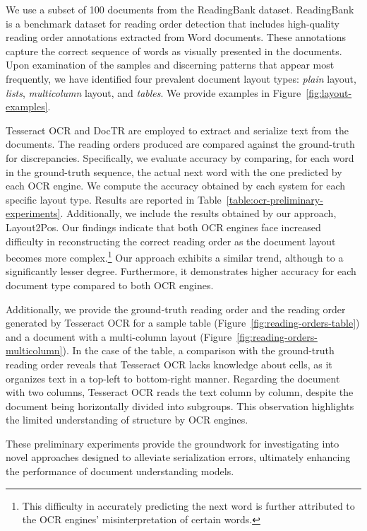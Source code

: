 We use a subset of 100 documents from the ReadingBank \citep{wang2021layoutreader} dataset. ReadingBank is a benchmark dataset for reading order detection that includes high-quality reading order annotations extracted from Word documents. These annotations capture the correct sequence of words as visually presented in the documents. Upon examination of the samples and discerning patterns that appear most frequently, we have identified four prevalent document layout types: \textit{plain} layout, \textit{lists}, \textit{multicolumn} layout, and \textit{tables}. We provide examples in Figure~\ref{fig:layout-examples}. 

Tesseract OCR and DocTR are employed to extract and serialize text from the documents. The reading orders produced are compared against the ground-truth for discrepancies. Specifically, we evaluate accuracy by comparing, for each word in the ground-truth sequence, the actual next word with the one predicted by each \ac{OCR} engine. We compute the accuracy obtained by each system for each specific layout type. Results are reported in Table~\ref{table:ocr-preliminary-experiments}. Additionally, we include the results obtained by our approach, Layout2Pos. Our findings indicate that both \ac{OCR} engines face increased difficulty in reconstructing the correct reading order as the document layout becomes more complex.\footnote{This difficulty in accurately predicting the next word is further attributed to the \ac{OCR} engines' misinterpretation of certain words.} Our approach exhibits a similar trend, although to a significantly lesser degree. Furthermore, it demonstrates higher accuracy for each document type compared to both OCR engines.

Additionally, we provide the ground-truth reading order and the reading order generated by Tesseract OCR for a sample table (Figure~\ref{fig:reading-orders-table}) and a document with a multi-column layout (Figure~\ref{fig:reading-orders-multicolumn}). In the case of the table, a comparison with the ground-truth reading order reveals that Tesseract OCR lacks knowledge about cells, as it organizes text in a top-left to bottom-right manner. Regarding the document with two columns, Tesseract OCR reads the text column by column, despite the document being horizontally divided into subgroups. This observation highlights the limited understanding of structure by \ac{OCR} engines. 

These preliminary experiments provide the groundwork for investigating into novel approaches designed to alleviate serialization errors, ultimately enhancing the performance of document understanding models.

